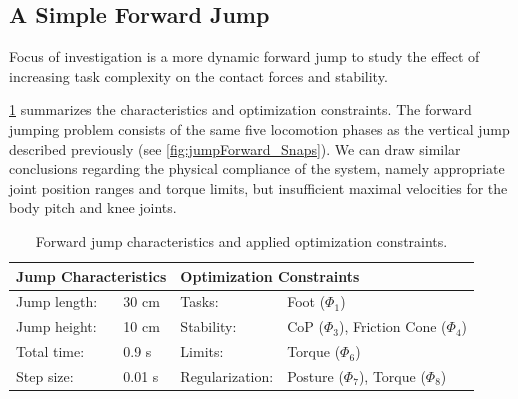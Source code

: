 \subsection{A Simple Forward Jump}
Focus of investigation is a more dynamic forward jump to study the effect of increasing task complexity on the contact forces and stability.

\cref{tab:jumpForward} summarizes the characteristics and optimization constraints. The forward jumping problem consists of the same five locomotion phases as the vertical jump described previously (see \cref{fig:jumpForward_Snaps}). 
We can draw similar conclusions regarding the physical compliance of the system, namely appropriate joint position ranges and torque limits, but insufficient maximal velocities for the body pitch and knee joints. 

\begin{table}[t]
\centering
\caption{Forward jump characteristics and applied optimization constraints.}
\begin{tabular}{|ll|ll|}
\hline
\multicolumn{2}{|l|}{\textbf{Jump Characteristics}} & \multicolumn{2}{l|}{\textbf{Optimization Constraints}} \\ \hline
Jump length:& 30 cm 	& Tasks: 			& Foot ($\Phi_1$) \\ \hline
Jump height:& 10 cm 	& Stability: 		& \gls{CoP} ($\Phi_3$), Friction Cone ($\Phi_4$)\\ \hline
Total time:& 0.9 s  	& Limits: 			& Torque ($\Phi_6$)\\ \hline
Step size:& 0.01 s   & Regularization: 	& Posture ($\Phi_7$), Torque ($\Phi_8$)\\ \hline
\end{tabular}
\label{tab:jumpForward}
\end{table}

